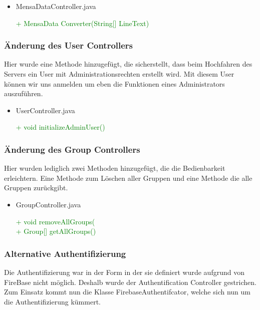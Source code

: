 \documentclass[a4paper]{scrreprt}
\begin{document}
\begin{itemize}
\item{MensaDataController.java}

\textcolor{green}{+ MensaData Converter(String[] LineText)}\\
\end{itemize}

\subsubsection{Änderung des User Controllers}
Hier wurde eine Methode hinzugefügt, die sicherstellt, dass beim Hochfahren des Servers ein User mit Administrationsrechten erstellt wird. Mit diesem User können wir uns anmelden um eben die Funktionen eines Administrators auszuführen.

\begin{itemize}
\item{UserController.java}

\textcolor{green}{+ void initializeAdminUser()}\\
\end{itemize}

\subsubsection{Änderung des Group Controllers}
Hier wurden lediglich zwei Methoden hinzugefügt, die die Bedienbarkeit erleichtern. Eine Methode zum Löschen aller Gruppen und eine Methode die alle Gruppen zurückgibt.

\begin{itemize}
\item{GroupController.java}

\textcolor{green}{+ void removeAllGroups(}\\
\textcolor{green}{+ Group[] getAllGroups()}\\
\end{itemize}

\subsubsection{Alternative Authentifizierung}
Die Authentifizierung war in der Form in der sie definiert wurde aufgrund von FireBase nicht möglich. Deshalb wurde der Authentification Controller gestrichen. Zum Einsatz kommt nun die Klasse FirebaseAuthentifcator, welche sich nun um die Authentifizierung kümmert.
\end{document}
